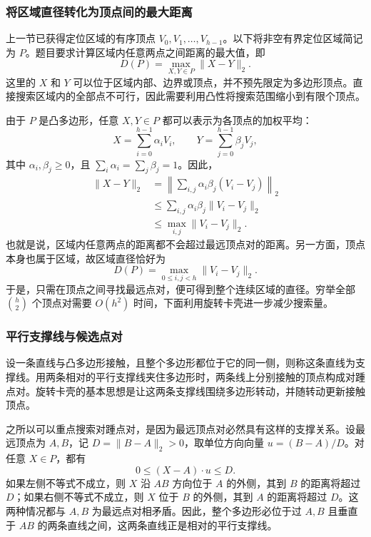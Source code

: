 \subsubsection{将区域直径转化为顶点间的最大距离}

上一节已获得定位区域的有序顶点 $V_0,V_1,\ldots,V_{h-1}$。以下将非空有界定位区域简记为 $P$。题目要求计算区域内任意两点之间距离的最大值，即
\begin{equation}
    D(P)=\max_{X,Y\in P}\|X-Y\|_2.
\end{equation}
这里的 $X$ 和 $Y$ 可以位于区域内部、边界或顶点，并不预先限定为多边形顶点。直接搜索区域内的全部点不可行，因此需要利用凸性将搜索范围缩小到有限个顶点。

由于 $P$ 是凸多边形，任意 $X,Y\in P$ 都可以表示为各顶点的加权平均：
\begin{equation}
    X=\sum_{i=0}^{h-1}\alpha_iV_i,\qquad
    Y=\sum_{j=0}^{h-1}\beta_jV_j,
\end{equation}
其中 $\alpha_i,\beta_j\ge0$，且 $\sum_i\alpha_i=\sum_j\beta_j=1$。因此，
\begin{equation}
\begin{aligned}
    \|X-Y\|_2
    &=\left\|\sum_{i,j}\alpha_i\beta_j(V_i-V_j)\right\|_2\\
    &\le\sum_{i,j}\alpha_i\beta_j\|V_i-V_j\|_2\\
    &\le\max_{i,j}\|V_i-V_j\|_2.
\end{aligned}
\end{equation}
也就是说，区域内任意两点的距离都不会超过最远顶点对的距离。另一方面，顶点本身也属于区域，故区域直径恰好为
\begin{equation}\label{eq:p1-vertexdiam}
    D(P)=\max_{0\le i,j<h}\|V_i-V_j\|_2.
\end{equation}
于是，只需在顶点之间寻找最远点对，便可得到整个连续区域的直径。穷举全部 $\binom h2$ 个顶点对需要 $O(h^2)$ 时间，下面利用旋转卡壳进一步减少搜索量。

\subsubsection{平行支撑线与候选点对}

设一条直线与凸多边形接触，且整个多边形都位于它的同一侧，则称这条直线为支撑线。用两条相对的平行支撑线夹住多边形时，两条线上分别接触的顶点构成对踵点对。旋转卡壳的基本思想是让这两条支撑线围绕多边形转动，并随转动更新接触顶点\cite{p1-toussaint1983}。

之所以可以重点搜索对踵点对，是因为最远顶点对必然具有这样的支撑关系。设最远顶点为 $A,B$，记 $D=\|B-A\|_2>0$，取单位方向向量 $u=(B-A)/D$。对任意 $X\in P$，都有
\begin{equation}\label{eq:p1-support}
    0\le(X-A)\cdot u\le D.
\end{equation}
如果左侧不等式不成立，则 $X$ 沿 $AB$ 方向位于 $A$ 的外侧，其到 $B$ 的距离将超过 $D$；如果右侧不等式不成立，则 $X$ 位于 $B$ 的外侧，其到 $A$ 的距离将超过 $D$。这两种情况都与 $A,B$ 为最远点对相矛盾。因此，整个多边形必位于过 $A,B$ 且垂直于 $AB$ 的两条直线之间，这两条直线正是相对的平行支撑线。

